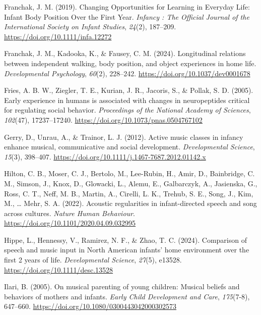 \documentclass[
]{article}
\newlength{\cslhangindent}
\newenvironment{CSLReferences}[2] %
 {\begin{list}{}{%
  \setlength{\itemindent}{0pt}
  \setlength{\leftmargin}{0pt}
  \setlength{\parsep}{0pt}
  \ifodd #1
   \setlength{\leftmargin}{\cslhangindent}
   \setlength{\itemindent}{-1\cslhangindent}
  \fi
  \setlength{\itemsep}{#2\baselineskip}}}
 {\end{list}}
\begin{document}
\begin{CSLReferences}{1}{0}
Franchak, J. M. (2019). Changing {Opportunities} for {Learning} in
{Everyday Life}: {Infant Body Position Over} the {First Year}.
\emph{Infancy : The Official Journal of the International Society on
Infant Studies}, \emph{24}(2), 187--209.
\url{https://doi.org/10.1111/infa.12272}

Franchak, J. M., Kadooka, K., \& Fausey, C. M. (2024). Longitudinal
relations between independent walking, body position, and object
experiences in home life. \emph{Developmental Psychology}, \emph{60}(2),
228--242. \url{https://doi.org/10.1037/dev0001678}

Fries, A. B. W., Ziegler, T. E., Kurian, J. R., Jacoris, S., \& Pollak,
S. D. (2005). Early experience in humans is associated with changes in
neuropeptides critical for regulating social behavior. \emph{Proceedings
of the National Academy of Sciences}, \emph{102}(47), 17237--17240.
\url{https://doi.org/10.1073/pnas.0504767102}

Gerry, D., Unrau, A., \& Trainor, L. J. (2012). Active music classes in
infancy enhance musical, communicative and social development.
\emph{Developmental Science}, \emph{15}(3), 398--407.
\url{https://doi.org/10.1111/j.1467-7687.2012.01142.x}

Hilton, C. B., Moser, C. J., Bertolo, M., Lee-Rubin, H., Amir, D.,
Bainbridge, C. M., Simson, J., Knox, D., Glowacki, L., Alemu, E.,
Galbarczyk, A., Jasienska, G., Ross, C. T., Neff, M. B., Martin, A.,
Cirelli, L. K., Trehub, S. E., Song, J., Kim, M., \ldots{} Mehr, S. A.
(2022). Acoustic regularities in infant-directed speech and song across
cultures. \emph{Nature Human Behaviour}.
\url{https://doi.org/10.1101/2020.04.09.032995}

Hippe, L., Hennessy, V., Ramirez, N. F., \& Zhao, T. C. (2024).
Comparison of speech and music input in {North American} infants' home
environment over the first 2 years of life. \emph{Developmental
Science}, \emph{27}(5), e13528. \url{https://doi.org/10.1111/desc.13528}

Ilari, B. (2005). On musical parenting of young children: {Musical}
beliefs and behaviors of mothers and infants. \emph{Early Child
Development and Care}, \emph{175}(7-8), 647--660.
\url{https://doi.org/10.1080/0300443042000302573}


\end{CSLReferences}
\end{document}

